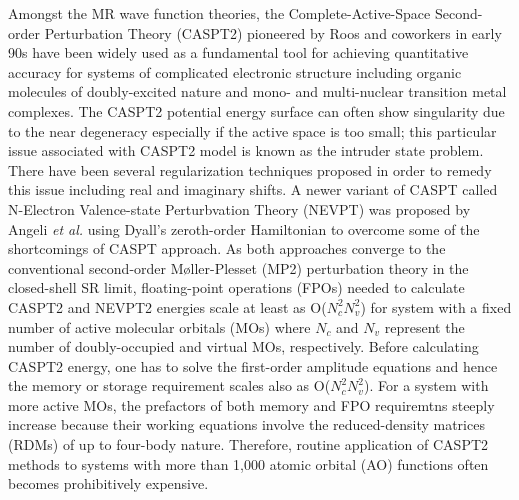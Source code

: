 \documentclass[aip,jcp,amsmath]{revtex4-1}
\begin{document}
%
%
%
Amongst the MR wave function theories, the Complete-Active-Space Second-order Perturbation Theory (CASPT2) pioneered by Roos and coworkers\cite{doi:10.1021/j100377a012,doi:10.1063/1.462209} in early 90s have been widely used as a fundamental tool for achieving quantitative accuracy for systems of complicated electronic structure including organic molecules of doubly-excited nature\cite{doi:10.1063/1.2889385} and mono-\cite{doi:10.1021/ct900567c,doi:10.1021/acs.jctc.9b00166} and multi-nuclear\cite{Cramer2008,doi:10.1002/chem.201902766} transition metal complexes.
%
The CASPT2 potential energy surface can often show singularity due to the near degeneracy especially if the active space is too small; this particular issue associated with CASPT2 model is known as the intruder state problem.
%
There have been several regularization techniques proposed in order to remedy this issue including real\cite{ROOS1995215} and imaginary\cite{FORSBERG1997196} shifts.
%
A newer variant of CASPT called N-Electron Valence-state Perturbvation Theory (NEVPT) was proposed by Angeli {\it et al.}\cite{angeliintroduction2001,angelin-electron2002,angelinew2006} using Dyall's zeroth-order Hamiltonian\cite{dyallthe1995} to overcome some of the shortcomings of CASPT approach.
%
As both approaches converge to the conventional second-order M\o ller-Plesset (MP2) perturbation theory\cite{MP2} in the closed-shell SR limit, floating-point operations (FPOs) needed to calculate CASPT2 and NEVPT2 energies scale at least as O($N_c^2N_v^2$) for system with a fixed number of active molecular orbitals (MOs) where $N_c$ and $N_v$ represent the number of doubly-occupied and virtual MOs, respectively.
%
Before calculating CASPT2 energy, one has to solve the first-order amplitude equations and hence the memory or storage requirement scales also as O($N_c^2N_v^2$).
%
For a system with more active MOs, the prefactors of both memory and FPO requiremtns steeply increase because their working equations involve the reduced-density matrices (RDMs) of up to four-body nature.
%
Therefore, routine application of CASPT2 methods to systems with more than 1,000 atomic orbital (AO) functions often becomes prohibitively expensive.
\end{document}
